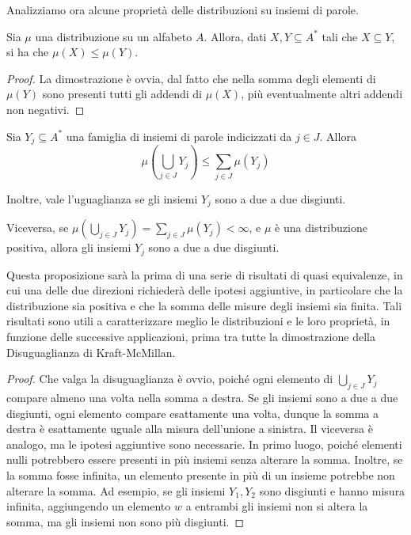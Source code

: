 Analizziamo ora alcune proprietà delle distribuzioni su insiemi di parole.
\begin{proposition}[label=prop:distribution_monotonicity]{}
  Sia \(\mu\) una distribuzione su un alfabeto \(A\).
  Allora, dati \(X,Y \subseteq A^*\) tali che \(X \subseteq Y\), si ha che \(\mu(X) \leq \mu(Y)\).
\end{proposition}
\begin{proof}
  La dimostrazione è ovvia, dal fatto che nella somma degli elementi di \(\mu(Y)\) sono presenti tutti gli addendi di \(\mu(X)\), più eventualmente altri addendi non negativi.
\end{proof}

\begin{proposition}[label=prop:dist_union_leq_sum_dist]{}
  Sia \(Y_j \subseteq A^*\) una famiglia di insiemi di parole indicizzati da \(j \in J\). 
  Allora
  \[\mu(\bigcup_{j \in J}Y_j) \leq \sum_{j\in J} \mu(Y_j)\]

  Inoltre, vale l'uguaglianza se gli insiemi \(Y_j\) sono a due a due disgiunti.

  Viceversa, se \(\mu(\bigcup_{j \in J}Y_j) = \sum_{j\in J} \mu(Y_j) < \infty\), e \(\mu\) è una distribuzione positiva, allora gli insiemi \(Y_j\) sono a due a due disgiunti.
\end{proposition}

Questa proposizione sarà la prima di una serie di risultati di quasi equivalenze, in cui una delle due direzioni richiederà delle ipotesi aggiuntive, in particolare che la distribuzione sia positiva e che la somma delle misure degli insiemi sia finita.
Tali risultati sono utili a caratterizzare meglio le distribuzioni e le loro proprietà, in funzione delle successive applicazioni, prima tra tutte la dimostrazione della Disuguaglianza di Kraft-McMillan.

\begin{proof}
  Che valga la disuguaglianza è ovvio, poiché ogni elemento di \(\bigcup_{j \in J}Y_j\) compare almeno una volta nella somma a destra.
  Se gli insiemi sono a due a due disgiunti, ogni elemento compare esattamente una volta, dunque la somma a destra è esattamente uguale alla misura dell'unione a sinistra.
  Il viceversa è analogo, ma le ipotesi aggiuntive sono necessarie.
  In primo luogo, poiché elementi nulli potrebbero essere presenti in più insiemi senza alterare la somma.
  Inoltre, se la somma fosse infinita, un elemento presente in più di un insieme potrebbe non alterare la somma.
  Ad esempio, se gli insiemi \(Y_1,Y_2\) sono disgiunti e hanno misura infinita, aggiungendo un elemento \(w\) a entrambi gli insiemi non si altera la somma, ma gli insiemi non sono più disgiunti.
\end{proof}

